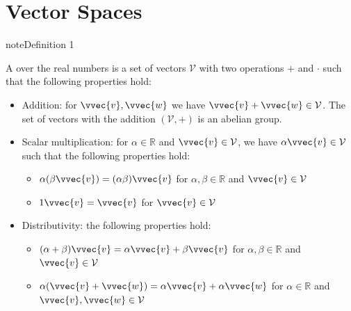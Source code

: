 \documentclass[letterpaper,10pt,english]{jupyterBook}
\begin{document}
\section{Vector Spaces}
\label{\detokenize{linalg_spaces:vector-spaces}}\label{\detokenize{linalg_spaces::doc}}\label{linalg_spaces:definition-0}
\begin{sphinxadmonition}{note}{Definition 1}



\sphinxAtStartPar
A  over the real numbers is a set of vectors \(\mathcal{V}\) with two operations \(+\) and \(\cdot\) such that the following properties hold:
\begin{itemize}
\item {} 
\sphinxAtStartPar
Addition: for \(\vvec{v},\vvec{w}\) we have \(\vvec{v}+\vvec{w}\in\mathcal{V}\). The set of vectors with the addition \((\mathcal{V},+)\) is an abelian group.

\item {} 
\sphinxAtStartPar
Scalar multiplication: for \(\alpha\in\mathbb{R}\) and \(\vvec{v}\in\mathcal{V}\), we have \(\alpha\vvec{v}\in\mathcal{V}\) such that the following properties hold:
\begin{itemize}
\item {} 
\sphinxAtStartPar
\(\alpha(\beta\vvec{v}) = (\alpha\beta) \vvec{v}\) for \(\alpha,\beta\in\mathbb{R}\) and \(\vvec{v}\in\mathcal{V}\)

\item {} 
\sphinxAtStartPar
\(1\vvec{v}=\vvec{v}\) for \(\vvec{v}\in\mathcal{V}\)

\end{itemize}

\item {} 
\sphinxAtStartPar
Distributivity: the following properties hold:
\begin{itemize}
\item {} 
\sphinxAtStartPar
\((\alpha + \beta)\vvec{v} = \alpha\vvec{v} +\beta \vvec{v}\) for \(\alpha,\beta\in\mathbb{R}\) and \(\vvec{v}\in\mathcal{V}\)

\item {} 
\sphinxAtStartPar
\(\alpha (\vvec{v}+\vvec{w})=\alpha \vvec{v}+\alpha\vvec{w}\) for \(\alpha\in\mathbb{R}\) and \(\vvec{v},\vvec{w}\in\mathcal{V}\)

\end{itemize}

\end{itemize}
\end{sphinxadmonition}
\end{document}
